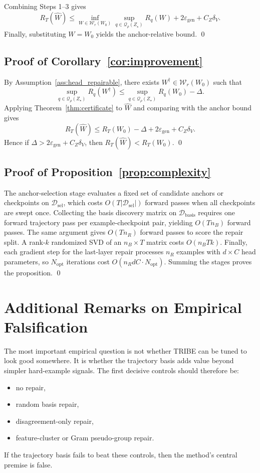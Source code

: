 \documentclass{article}
\newcommand{\cD}{\mathcal{D}}
\newcommand{\cQ}{\mathcal{Q}}
\newcommand{\cW}{\mathcal{W}}
\newcommand{\tribe}{\textup{\textsc{TRIBE}}}
\newcommand{\1}{\mathbbm{1}}
\begin{document}
Combining Steps 1--3 gives
\[
    R_T(\widehat W)
    \le
    \inf_{W\in\cW_r(W_0)}
    \sup_{q\in\cQ_\rho(Z_\star)} R_q(W)
    +
    2\varepsilon_{\mathrm{gen}}
    +
    C_Z\delta_V.
\]
Finally, substituting \(W=W_0\) yields the anchor-relative bound.
\qed

\subsection{Proof of Corollary~\ref{cor:improvement}}

By Assumption~\ref{ass:head_repairable}, there exists \(W^\dagger \in \cW_r(W_0)\) such that
\[
    \sup_{q\in\cQ_\rho(Z_\star)} R_q(W^\dagger)
    \le
    \sup_{q\in\cQ_\rho(Z_\star)} R_q(W_0) - \Delta.
\]
Applying Theorem~\ref{thm:certificate} to \(\widehat W\) and comparing with the anchor bound gives
\[
    R_T(\widehat W)
    \le
    R_T(W_0)
    -
    \Delta
    +
    2\varepsilon_{\mathrm{gen}}
    +
    C_Z\delta_V.
\]
Hence if \(\Delta > 2\varepsilon_{\mathrm{gen}} + C_Z\delta_V\), then \(R_T(\widehat W) < R_T(W_0)\).
\qed

\subsection{Proof of Proposition~\ref{prop:complexity}}

The anchor-selection stage evaluates a fixed set of candidate anchors or checkpoints on \(\cD_{\mathrm{sel}}\), which costs \(O(T |\cD_{\mathrm{sel}}|)\) forward passes when all checkpoints are swept once. Collecting the basis discovery matrix on \(\cD_{\mathrm{basis}}\) requires one forward trajectory pass per example-checkpoint pair, yielding \(O(T n_B)\) forward passes. The same argument gives \(O(T n_R)\) forward passes to score the repair split. A rank-\(k\) randomized SVD of an \(n_B\times T\) matrix costs \(O(n_B T k)\). Finally, each gradient step for the last-layer repair processes \(n_R\) examples with \(d\times C\) head parameters, so \(N_{\mathrm{opt}}\) iterations cost \(O(n_R d C \cdot N_{\mathrm{opt}})\). Summing the stages proves the proposition.
\qed

\section{Additional Remarks on Empirical Falsification}

The most important empirical question is not whether \tribe{} can be tuned to look good somewhere. It is whether the trajectory basis adds value beyond simpler hard-example signals. The first decisive controls should therefore be:
\begin{itemize}[leftmargin=1.4em]
    \item no repair,
    \item random basis repair,
    \item disagreement-only repair,
    \item feature-cluster or Gram pseudo-group repair.
\end{itemize}
If the trajectory basis fails to beat these controls, then the method's central premise is false.
\end{document}
